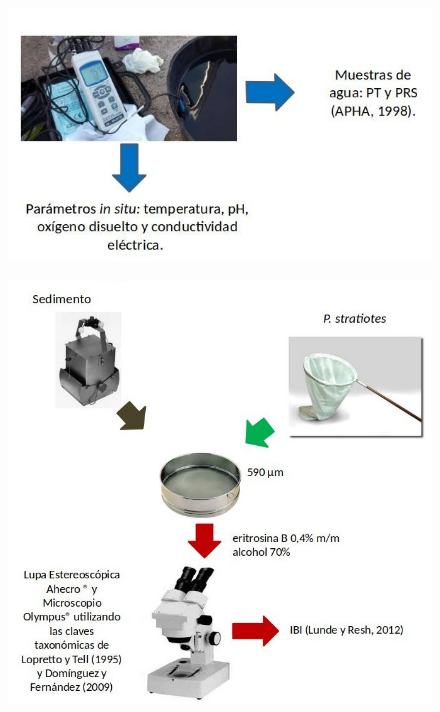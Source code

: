 \documentclass[final]{beamer}
\newlength{\onecolwid}
\begin{document}
\begin{frame}[t]
\begin{columns}[t]
\begin{column}{\onecolwid}
           \begin{multicols}{2}
                \begin{figure}
                	\vspace*{-0.90cm}
                    \includegraphics[width=0.9\linewidth]{met.jpg}
				\end{figure}
                \begin{figure}
                	\vspace*{-0.90cm}
                    \includegraphics[width=0.9\linewidth]{met2.jpg}
				\end{figure}
                \end{multicols}
          

\end{column}
\end{columns}
\end{frame}
\end{document}
